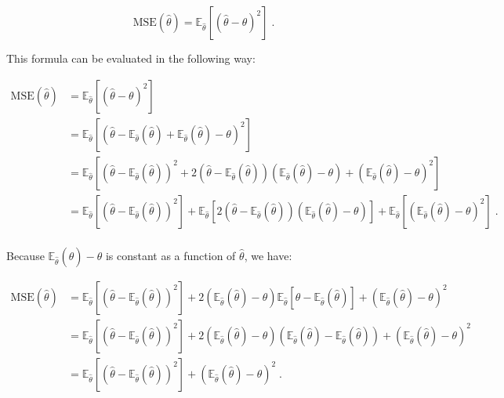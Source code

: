 \documentclass[a4paper,12pt,twoside]{book}
\begin{document}
\begin{equation} \label{eq:mse-bnv-MSE-def}
\mathrm{MSE}(\hat{\theta}) = \mathbb{E}_{\hat{\theta}}\left[ \left( \hat{\theta} - \theta \right)^2 \right] \; .
\end{equation}

This formula can be evaluated in the following way:

\begin{equation} \label{eq:mse-bnv-MSE-ref1}
\begin{split}
\mathrm{MSE}(\hat{\theta}) &= \mathbb{E}_{\hat{\theta}}\left[ \left( \hat{\theta} - \theta \right)^2 \right] \\
&= \mathbb{E}_{\hat{\theta}}\left[ \left( \hat{\theta} - \mathbb{E}_{\hat{\theta}}(\hat{\theta}) + \mathbb{E}_{\hat{\theta}}(\hat{\theta}) - \theta \right)^2 \right] \\
&= \mathbb{E}_{\hat{\theta}}\left[ \left( \hat{\theta} - \mathbb{E}_{\hat{\theta}}(\hat{\theta}) \right)^2 + 2 \left( \hat{\theta} - \mathbb{E}_{\hat{\theta}}(\hat{\theta}) \right) \left( \mathbb{E}_{\hat{\theta}}(\hat{\theta}) - \theta \right) + \left( \mathbb{E}_{\hat{\theta}}(\hat{\theta}) - \theta \right)^2 \right] \\
&= \mathbb{E}_{\hat{\theta}}\left[ \left( \hat{\theta} - \mathbb{E}_{\hat{\theta}}(\hat{\theta}) \right)^2 \right] + \mathbb{E}_{\hat{\theta}}\left[ 2 \left( \hat{\theta} - \mathbb{E}_{\hat{\theta}}(\hat{\theta}) \right) \left( \mathbb{E}_{\hat{\theta}}(\hat{\theta}) - \theta \right) \right] + \mathbb{E}_{\hat{\theta}}\left[ \left( \mathbb{E}_{\hat{\theta}}(\hat{\theta}) - \theta \right)^2 \right] \; . \\
\end{split}
\end{equation}

Because $\mathbb{E}_{\hat{\theta}}(\hat{\theta}) - \theta$ is constant as a function of $\hat{\theta}$, we have:

\begin{equation} \label{eq:mse-bnv-MSE-ref2}
\begin{split}
\mathrm{MSE}(\hat{\theta}) &= \mathbb{E}_{\hat{\theta}}\left[ \left( \hat{\theta} - \mathbb{E}_{\hat{\theta}}(\hat{\theta}) \right)^2 \right] + 2  \left( \mathbb{E}_{\hat{\theta}}(\hat{\theta}) - \theta \right) \mathbb{E}_{\hat{\theta}}\left[ \hat{\theta} - \mathbb{E}_{\hat{\theta}}(\hat{\theta}) \right] + \left( \mathbb{E}_{\hat{\theta}}(\hat{\theta}) - \theta \right)^2 \\
&= \mathbb{E}_{\hat{\theta}}\left[ \left( \hat{\theta} - \mathbb{E}_{\hat{\theta}}(\hat{\theta}) \right)^2 \right] + 2  \left( \mathbb{E}_{\hat{\theta}}(\hat{\theta}) - \theta \right) \left( \mathbb{E}_{\hat{\theta}}(\hat{\theta}) - \mathbb{E}_{\hat{\theta}}(\hat{\theta}) \right) + \left( \mathbb{E}_{\hat{\theta}}(\hat{\theta}) - \theta \right)^2 \\
&= \mathbb{E}_{\hat{\theta}}\left[ \left( \hat{\theta} - \mathbb{E}_{\hat{\theta}}(\hat{\theta}) \right)^2 \right] + \left( \mathbb{E}_{\hat{\theta}}(\hat{\theta}) - \theta \right)^2 \; . \\
\end{split}
\end{equation}
\end{document}
